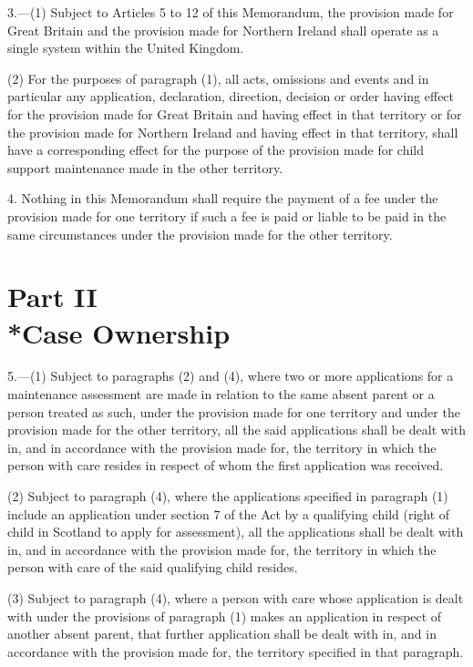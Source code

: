 \documentclass[a4paper]{article}
\newcommand{\parthead}{}
\begin{document}
3.—(1) Subject to Articles 5 to 12 of this Memorandum, the provision made for Great Britain and the provision made for Northern Ireland shall operate as a single system within the United Kingdom.

(2) For the purposes of paragraph (1), all acts, omissions and events and in particular any application, declaration, direction, decision or order having effect for the provision made for Great Britain and having effect in that territory or for the provision made for Northern Ireland and having effect in that territory, shall have a corresponding effect for the purpose of the provision made for child support maintenance made in the other territory.

\medskip

4.  Nothing in this Memorandum shall require the payment of a fee under the provision made for one territory if such a fee is paid or liable to be paid in the same circumstances under the provision made for the other territory.

\section[Part II --- Case Ownership]{Part II\\*Case Ownership}

\renewcommand\parthead{--- Schedule 1 Part II}

5.—(1) Subject to paragraphs (2) and (4), where two or more applications for a maintenance assessment are made in relation to the same absent parent or a person treated as such, under the provision made for one territory and under the provision made for the other territory, all the said applications shall be dealt with in, and in accordance with the provision made for, the territory in which the person with care resides in respect of whom the first application was received.

(2) Subject to paragraph (4), where the applications specified in paragraph (1) include an application under section 7 of the Act by a qualifying child (right of child in Scotland to apply for assessment), all the applications shall be dealt with in, and in accordance with the provision made for, the territory in which the person with care of the said qualifying child resides.

(3) Subject to paragraph (4), where a person with care whose application is dealt with under the provisions of paragraph (1) makes an application in respect of another absent parent, that further application shall be dealt with in, and in accordance with the provision made for, the territory specified in that paragraph.
\end{document}
